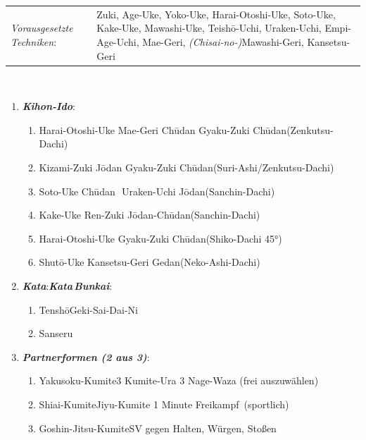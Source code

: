 \documentclass[a5paper,landscape,DIV=calc,11pt,notitlepage]{scrartcl}
\newcommand{\bull}{\,\textbullet\,}
\begin{document}
\pagebreak
\begin{tcolorbox}[colback=white,colframe=BRBELT,coltitle=white,title=2. Kyu: Braun]
	\renewcommand{\labelenumi}{\alph{enumi}.)}
	\renewcommand{\labelenumii}{\arabic*.}
	{\scriptsize 
		\begin{tabularx}{\textwidth}{lX}
			\textit{Vorausgesetzte Techniken}:& Zuki, Age-Uke, Yoko-Uke, Harai-Otoshi-Uke, Soto-Uke, Kake-Uke, Mawashi-Uke, Teish\={o}-Uchi, Uraken-Uchi, \mbox{Empi-Age-Uchi}, Mae-Geri, \textit{(Chisai-no-)}Mawashi-Geri, Kansetsu-Geri
		\end{tabularx}\\}\vspace{12pt}
	\begin{enumerate}[nosep]
		\item \textit{\textbf{Kihon-Ido}}:
		\begin{enumerate}[nosep]
			\item Harai-Otoshi-Uke\bull Mae-Geri Ch\={u}dan\bull Gyaku-Zuki Ch\={u}dan\tabto{280pt}(Zenkutsu-Dachi)
			\item Kizami-Zuki J\={o}dan\bull Gyaku-Zuki Ch\={u}dan\tabto{280pt}(Suri-Ashi/Zenkutsu-Dachi)
			\item Soto-Uke Ch\={u}dan \bull Uraken-Uchi J\={o}dan\tabto{280pt}(Sanchin-Dachi)
			\item Kake-Uke\bull Ren-Zuki J\={o}dan-Ch\={u}dan\tabto{280pt}(Sanchin-Dachi)
			\item Harai-Otoshi-Uke\bull Gyaku-Zuki Ch\={u}dan\tabto{280pt}(Shiko-Dachi 45°)
			\item Shut\={o}-Uke\bull Kansetsu-Geri Gedan\tabto{280pt}(Neko-Ashi-Dachi)
		\end{enumerate}\vspace{24pt}
		\item \textit{\textbf{Kata}}:\tabto{200pt}\textit{\textbf{Kata\,Bunkai}}:
		\begin{enumerate}[nosep]
			\item Tensh\={o}\tabto{200pt}Geki-Sai-Dai-Ni
			\item Sanseru
		\end{enumerate}\vspace{24pt}
		\item \textit{\textbf{Partnerformen (2 aus 3)}}:
		\begin{enumerate}[nosep]
			\item Yakusoku-Kumite\tabto{200pt}3 Kumite-Ura\bull 3 Nage-Waza (frei auszuwählen)
			\item Shiai-Kumite\tabto{200pt}Jiyu-Kumite 1 Minute \frqq Freikampf\flqq~(sportlich)
			\item Goshin-Jitsu-Kumite\tabto{200pt}SV gegen Halten, Würgen, Stoßen
		\end{enumerate}
	\end{enumerate}
\end{tcolorbox}
\end{document}
